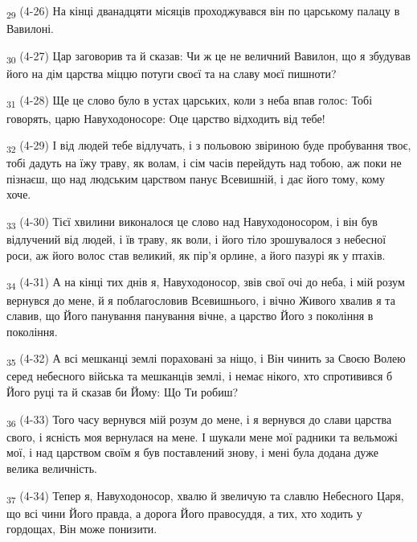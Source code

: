 \begin{tcolorbox}
\textsubscript{29} (4-26) На кінці дванадцяти місяців проходжувався він по царському палацу в Вавилоні.
\end{tcolorbox}
\begin{tcolorbox}
\textsubscript{30} (4-27) Цар заговорив та й сказав: Чи ж це не величний Вавилон, що я збудував його на дім царства міццю потуги своєї та на славу моєї пишноти?
\end{tcolorbox}
\begin{tcolorbox}
\textsubscript{31} (4-28) Ще це слово було в устах царських, коли з неба впав голос: Тобі говорять, царю Навуходоносоре: Оце царство відходить від тебе!
\end{tcolorbox}
\begin{tcolorbox}
\textsubscript{32} (4-29) І від людей тебе відлучать, і з польовою звіриною буде пробування твоє, тобі дадуть на їжу траву, як волам, і сім часів перейдуть над тобою, аж поки не пізнаєш, що над людським царством панує Всевишній, і дає його тому, кому хоче.
\end{tcolorbox}
\begin{tcolorbox}
\textsubscript{33} (4-30) Тієї хвилини виконалося це слово над Навуходоносором, і він був відлучений від людей, і їв траву, як воли, і його тіло зрошувалося з небесної роси, аж його волос став великий, як пір'я орлине, а його пазурі як у птахів.
\end{tcolorbox}
\begin{tcolorbox}
\textsubscript{34} (4-31) А на кінці тих днів я, Навуходоносор, звів свої очі до неба, і мій розум вернувся до мене, й я поблагословив Всевишнього, і вічно Живого хвалив я та славив, що Його панування панування вічне, а царство Його з покоління в покоління.
\end{tcolorbox}
\begin{tcolorbox}
\textsubscript{35} (4-32) А всі мешканці землі пораховані за ніщо, і Він чинить за Своєю Волею серед небесного війська та мешканців землі, і немає нікого, хто спротивився б Його руці та й сказав би Йому: Що Ти робиш?
\end{tcolorbox}
\begin{tcolorbox}
\textsubscript{36} (4-33) Того часу вернувся мій розум до мене, і я вернувся до слави царства свого, і ясність моя вернулася на мене. І шукали мене мої радники та вельможі мої, і над царством своїм я був поставлений знову, і мені була додана дуже велика величність.
\end{tcolorbox}
\begin{tcolorbox}
\textsubscript{37} (4-34) Тепер я, Навуходоносор, хвалю й звеличую та славлю Небесного Царя, що всі чини Його правда, а дорога Його правосуддя, а тих, хто ходить у гордощах, Він може понизити.
\end{tcolorbox}
